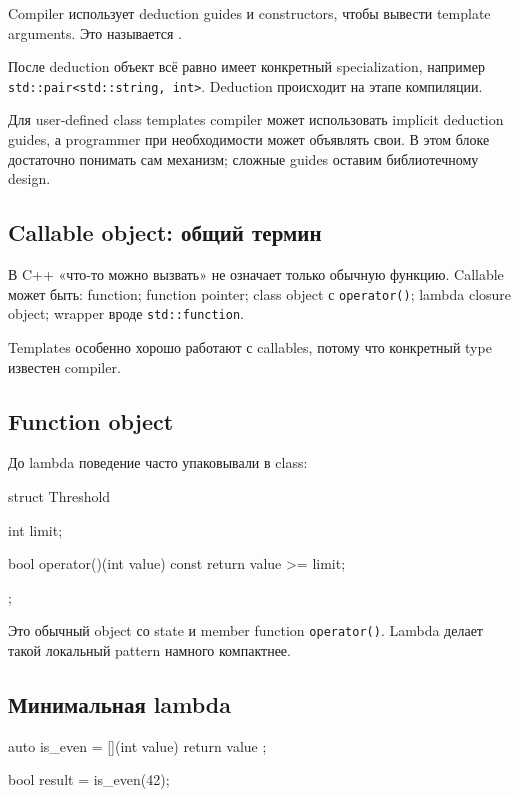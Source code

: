 Compiler использует deduction guides и constructors, чтобы вывести template
arguments. Это называется .

\begin{standardbox}
После deduction объект всё равно имеет конкретный specialization, например
\texttt{std::pair<std::string, int>}. Deduction происходит на этапе
компиляции.
\end{standardbox}

Для user-defined class templates compiler может использовать implicit deduction
guides, а programmer при необходимости может объявлять свои. В этом блоке
достаточно понимать сам механизм; сложные guides оставим библиотечному design.

\subsection{Callable object: общий термин}

В C++ «что-то можно вызвать» не означает только обычную функцию. Callable может
быть:
function; function pointer; class object с \texttt{operator()}; lambda closure object; wrapper вроде \texttt{std::function}.

Templates особенно хорошо работают с callables, потому что конкретный type
известен compiler.

\subsection{Function object}

До lambda поведение часто упаковывали в class:

\begin{cppcode}
struct Threshold {
    int limit;

    bool operator()(int value) const {
        return value >= limit;
    }
};
\end{cppcode}

Это обычный object со state и member function \texttt{operator()}. Lambda
делает такой локальный pattern намного компактнее.

\subsection{Минимальная lambda}

\begin{cppcode}
auto is_even = [](int value) {
    return value %
};

bool result = is_even(42);
\end{cppcode}

